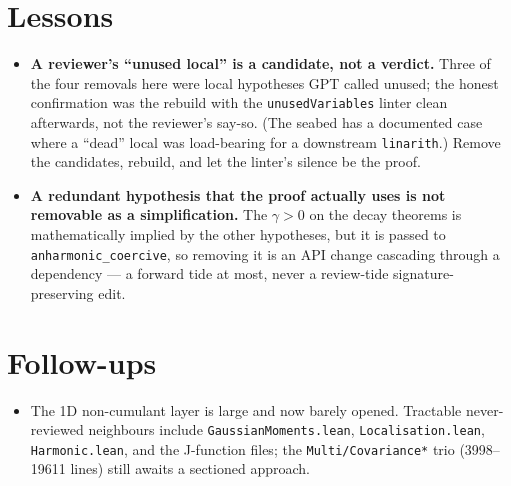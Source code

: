 \documentclass[11pt]{article}
\begin{document}
\section{Lessons}
\begin{itemize}[noitemsep]
  \item \textbf{A reviewer's ``unused local'' is a candidate, not a verdict.} Three of the four removals here
    were local hypotheses GPT called unused; the honest confirmation was the rebuild with the
    \texttt{unusedVariables} linter clean afterwards, not the reviewer's say-so. (The seabed has a documented
    case where a ``dead'' local was load-bearing for a downstream \texttt{linarith}.) Remove the candidates,
    rebuild, and let the linter's silence be the proof.
  \item \textbf{A redundant hypothesis that the proof actually uses is not removable as a simplification.} The
    $\gamma>0$ on the decay theorems is mathematically implied by the other hypotheses, but it is passed to
    \texttt{anharmonic\_coercive}, so removing it is an API change cascading through a dependency --- a forward
    tide at most, never a review-tide signature-preserving edit.
\end{itemize}

\section{Follow-ups}
\begin{itemize}[noitemsep]
  \item The 1D non-cumulant layer is large and now barely opened. Tractable never-reviewed neighbours include
    \texttt{GaussianMoments.lean}, \texttt{Localisation.lean}, \texttt{Harmonic.lean}, and the J-function
    files; the \texttt{Multi/Covariance*} trio (3998--19611 lines) still awaits a sectioned approach.
\end{itemize}
\end{document}
